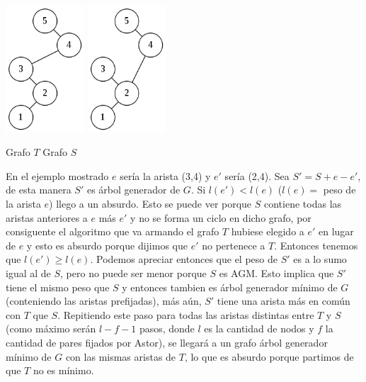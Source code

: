 \documentclass[a4paper,11pt] {article}
\begin{document}
\begin{itemize}
\begin{center}
 \includegraphics[width=0.22\textwidth]{Grafos/ej3figura1.png}
\hspace{100pt}
 \includegraphics[width=0.22\textwidth]{Grafos/ej3figura2.png}
\begin{center}
 Grafo $T$ \hspace{160pt} Grafo $S$
\end{center}
\end{center}

En el ejemplo mostrado $e$ ser\'ia la arista (3,4) y $e'$ ser\'ia (2,4). Sea $S'=S+e-e'$, de esta manera $S'$ es \'arbol generador de $G$. Si $l(e')<l(e)$ ($l(e)=$ peso de la arista $e$) llego a un absurdo. Esto se puede ver porque $S$ contiene todas las aristas anteriores a $e$ m\'as $e'$ y no se forma un ciclo en dicho grafo, por consiguente el algoritmo que va armando el grafo $T$ hubiese elegido a $e'$ en lugar de $e$ y esto es absurdo porque dijimos que $e'$ no pertenece a $T$. Entonces tenemos que $l(e')\geq l(e)$. Podemos apreciar entonces que el peso de $S'$ es a lo sumo igual al de $S$, pero no puede ser menor porque $S$ es AGM. Esto implica que $S'$ tiene el mismo peso que $S$ y entonces tambien es \'arbol generador m\'inimo de $G$ (conteniendo las aristas prefijadas), m\'as a\'un, $S'$ tiene una arista m\'as en com\'un con $T$ que $S$. Repitiendo este paso para todas las aristas distintas entre $T$ y $S$ (como m\'aximo ser\'an $l-f-1$ pasos, donde $l$ es la cantidad de nodos y $f$ la cantidad de pares fijados por Astor), se llegar\'a a un grafo \'arbol generador m\'inimo de $G$ con las mismas aristas de $T$, lo que es absurdo porque partimos de que $T$ no es m\'inimo.

\end{itemize}
\end{document}
